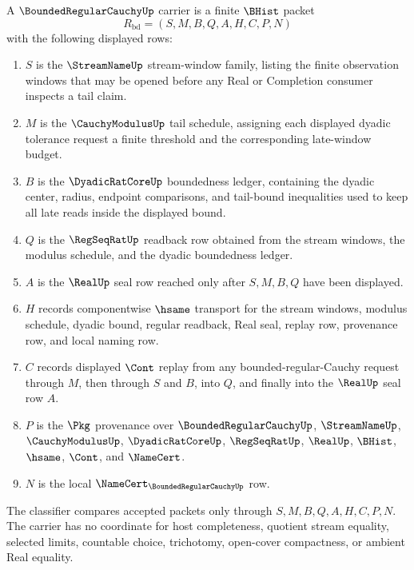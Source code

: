 \begin{definition}
\label{def:bounded-regular-cauchy-carrier}
A $\BoundedRegularCauchyUp$ carrier is a finite $\BHist$ packet
$$
R_{\mathrm{bd}}=(S,M,B,Q,A,H,C,P,N)
$$
with the following displayed rows:
\begin{enumerate}
\item $S$ is the $\StreamNameUp$ stream-window family, listing the finite observation windows that may be opened before any Real or Completion consumer inspects a tail claim.
\item $M$ is the $\CauchyModulusUp$ tail schedule, assigning each displayed dyadic tolerance request a finite threshold and the corresponding late-window budget.
\item $B$ is the $\DyadicRatCoreUp$ boundedness ledger, containing the dyadic center, radius, endpoint comparisons, and tail-bound inequalities used to keep all late reads inside the displayed bound.
\item $Q$ is the $\RegSeqRatUp$ readback row obtained from the stream windows, the modulus schedule, and the dyadic boundedness ledger.
\item $A$ is the $\RealUp$ seal row reached only after $S,M,B,Q$ have been displayed.
\item $H$ records componentwise $\hsame$ transport for the stream windows, modulus schedule, dyadic bound, regular readback, Real seal, replay row, provenance row, and local naming row.
\item $C$ records displayed $\Cont$ replay from any bounded-regular-Cauchy request through $M$, then through $S$ and $B$, into $Q$, and finally into the $\RealUp$ seal row $A$.
\item $P$ is the $\Pkg$ provenance over $\BoundedRegularCauchyUp$, $\StreamNameUp$, $\CauchyModulusUp$, $\DyadicRatCoreUp$, $\RegSeqRatUp$, $\RealUp$, $\BHist$, $\hsame$, $\Cont$, and $\NameCert$.
\item $N$ is the local $\NameCert_{\BoundedRegularCauchyUp}$ row.
\end{enumerate}
The classifier compares accepted packets only through $S,M,B,Q,A,H,C,P,N$. The carrier has no coordinate for host completeness, quotient stream equality, selected limits, countable choice, trichotomy, open-cover compactness, or ambient Real equality.
\end{definition}

